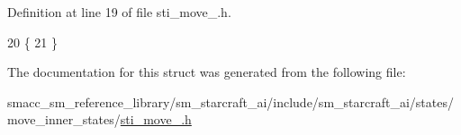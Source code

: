 Definition at line 19 of file sti\+\_\+move\+\_.\+h.


\begin{DoxyCode}
20   \{
21   \}
\end{DoxyCode}


The documentation for this struct was generated from the following file\+:\begin{DoxyCompactItemize}
\item 
smacc\+\_\+sm\+\_\+reference\+\_\+library/sm\+\_\+starcraft\+\_\+ai/include/sm\+\_\+starcraft\+\_\+ai/states/move\+\_\+inner\+\_\+states/\hyperlink{sti__move__1_8h}{sti\+\_\+move\+\_.\+h}\end{DoxyCompactItemize}
